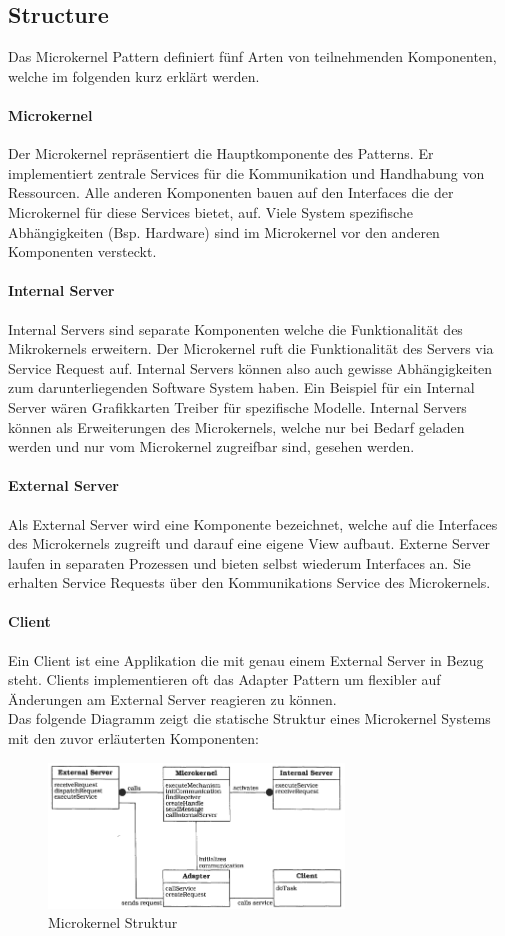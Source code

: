\subsection{Structure}
Das Microkernel Pattern definiert fünf Arten von teilnehmenden Komponenten, welche im folgenden kurz erklärt werden.
\paragraph{Microkernel} Der Microkernel repräsentiert die Hauptkomponente des Patterns. Er implementiert zentrale Services für die Kommunikation und Handhabung von Ressourcen. Alle anderen Komponenten bauen auf den Interfaces die der Microkernel für diese Services bietet, auf. Viele System spezifische Abhängigkeiten (Bsp. Hardware) sind im Microkernel vor den anderen Komponenten versteckt.
\paragraph{Internal Server} Internal Servers sind separate Komponenten welche die Funktionalität des Mikrokernels erweitern. Der Microkernel ruft die Funktionalität des Servers via Service Request auf. Internal Servers können also auch gewisse Abhängigkeiten zum darunterliegenden Software System haben. Ein Beispiel für ein Internal Server wären Grafikkarten Treiber für spezifische Modelle. Internal Servers können als Erweiterungen des Microkernels, welche nur bei Bedarf geladen werden und nur vom Microkernel zugreifbar sind, gesehen werden.
\paragraph{External Server} Als External Server wird eine Komponente bezeichnet, welche auf die Interfaces des Microkernels zugreift und darauf eine eigene View aufbaut. Externe Server laufen in separaten Prozessen und bieten selbst wiederum Interfaces an. Sie erhalten Service Requests über den Kommunikations Service des Microkernels.
\paragraph{Client} Ein Client ist eine Applikation die mit genau einem External Server in Bezug steht. Clients implementieren oft das Adapter Pattern um flexibler auf Änderungen am External Server reagieren zu können. \\
Das folgende Diagramm zeigt die statische Struktur eines Microkernel Systems mit den zuvor erläuterten Komponenten:
\begin{figure}[H]
	\centering
	\includegraphics[width=0.7\textwidth]{figures/05-microkernel-1}
	\caption{Microkernel Struktur}
\end{figure}
